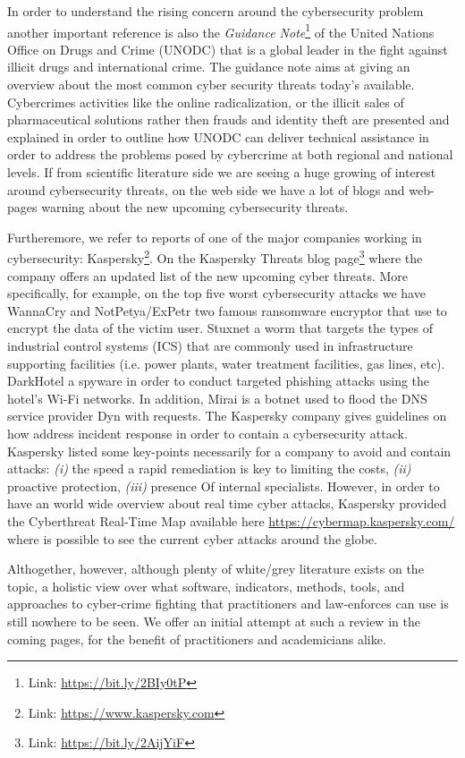 In order to understand the rising concern around the cybersecurity problem another important reference is also the \emph{Guidance Note}\footnote{Link: \href{}{https://bit.ly/2BIy0tP}} of the United Nations Office on Drugs and Crime (UNODC) that is a global leader in the fight against illicit drugs and international crime. The guidance note aims at giving an overview about the most common cyber security threats today's available. Cybercrimes activities like the online radicalization, or the illicit sales of pharmaceutical solutions rather then frauds and identity theft are presented and explained in order to outline how UNODC can deliver technical assistance in order to address the problems posed by cybercrime at both regional and national levels.
If from scientific literature side we are seeing a huge growing of interest around cybersecurity threats, on the web side we have a lot of blogs and web-pages warning about the new upcoming cybersecurity threats. 

Furtheremore, we refer to reports of one of the major companies working in cybersecurity: Kaspersky\footnote{Link: \href{}{https://www.kaspersky.com}}. On the Kaspersky Threats blog page\footnote{Link: \href{}{https://bit.ly/2AijYiF}} where the company offers an updated list of the new upcoming cyber threats. More specifically, for example, on the top five worst cybersecurity attacks we have WannaCry and NotPetya/ExPetr two famous ransomware encryptor that use to encrypt the data of the victim user. Stuxnet a worm that targets the types of industrial control systems (ICS) that are commonly used in infrastructure supporting facilities (i.e. power plants, water treatment facilities, gas lines, etc). DarkHotel a spyware in order to conduct targeted phishing attacks using the hotel's Wi-Fi networks. In addition, Mirai is a botnet used to flood the DNS service provider Dyn with requests. The Kaspersky company gives guidelines \cite{kaspersky} on how address incident response in order to contain a cybersecurity attack. Kaspersky listed some key-points necessarily for a company to avoid and contain attacks: \emph{(i)} the speed a rapid remediation is key to limiting the costs, \emph{(ii)} proactive protection, \emph{(iii)} presence Of internal specialists. However, in order to have an world wide overview about real time cyber attacks, Kaspersky provided the Cyberthreat Real-Time Map available here \href{}{https://cybermap.kaspersky.com/} where is possible to see the current cyber attacks around the globe. 

Althogether, however, although plenty of white/grey literature exists on the topic, a holistic view over what software, indicators, methods, tools, and approaches to cyber-crime fighting that practitioners and law-enforces can use is still nowhere to be seen. We offer an initial attempt at such a review in the coming pages, for the benefit of practitioners and academicians alike.

